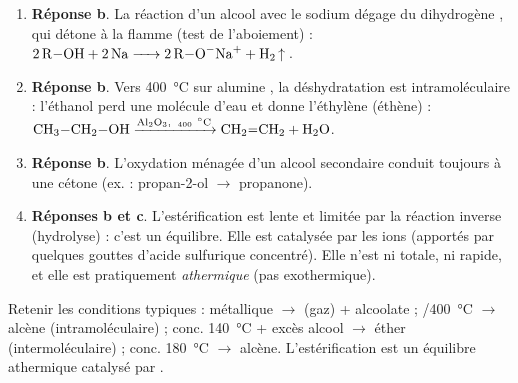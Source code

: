\documentclass[11pt]{article}
\newcommand{\cle}[1]{{\popxbold\color{popdark}#1}}
\begin{document}
\begin{corrige}
\begin{enumerate}
  \item \textbf{Réponse b}. La réaction d'un alcool avec le sodium dégage du \cle{dihydrogène} , qui détone à la flamme (test de l'aboiement) : $\ce{2 R-OH + 2 Na -> 2 R-O^-Na+ + H2 ^}$.
  \item \textbf{Réponse b}. Vers \SI{400}{\celsius} sur alumine , la déshydratation est \cle{intramoléculaire} : l'éthanol perd une molécule d'eau et donne l'\cle{éthylène} (éthène) : $\ce{CH3-CH2-OH ->[Al2O3,\ 400\ ^{\circ}C] CH2=CH2 + H2O}$.
  \item \textbf{Réponse b}. L'oxydation ménagée d'un alcool \cle{secondaire} conduit toujours à une \cle{cétone} (ex. : propan-2-ol $\rightarrow$ propanone).
  \item \textbf{Réponses b et c}. L'estérification est \cle{lente} et \cle{limitée} par la réaction inverse (hydrolyse) : c'est un équilibre. Elle est \cle{catalysée} par les ions  (apportés par quelques gouttes d'acide sulfurique concentré). Elle n'est ni totale, ni rapide, et elle est pratiquement \emph{athermique} (pas exothermique).
\end{enumerate}
\end{corrige}

\begin{attention}
Retenir les conditions typiques :  métallique $\rightarrow$  (gaz) + alcoolate ; /\SI{400}{\celsius} $\rightarrow$ alcène (intramoléculaire) ;  conc. \SI{140}{\celsius} + excès alcool $\rightarrow$ éther (intermoléculaire) ;  conc. \SI{180}{\celsius} $\rightarrow$ alcène. L'estérification est un équilibre athermique catalysé par .
\end{attention}
\end{document}
